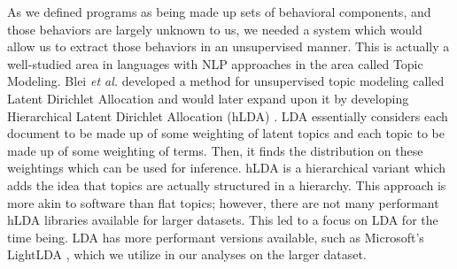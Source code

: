 As we defined programs as being made up sets of behavioral components, and those behaviors are largely unknown to us, we needed a system which would allow us to extract those behaviors in an unsupervised manner. This is actually a well-studied area in languages with NLP approaches in the area called Topic Modeling. Blei \textit{et al.} \cite{blei2003latent} developed a method for unsupervised topic modeling called Latent Dirichlet Allocation and would later expand upon it by developing Hierarchical Latent Dirichlet Allocation (hLDA) \cite{griffiths2004hierarchical}. LDA essentially considers each document to be made up of some weighting of latent topics and each topic to be made up of some weighting of terms. Then, it finds the distribution on these weightings which can be used for inference. hLDA is a hierarchical variant which adds the idea that topics are actually structured in a hierarchy. This approach is more akin to software than flat topics; however, there are not many performant hLDA libraries available for larger datasets. This led to a focus on LDA for the time being. LDA has more performant versions available, such as Microsoft's LightLDA \cite{yuan2015lightlda}, which we utilize in our analyses on the larger dataset.